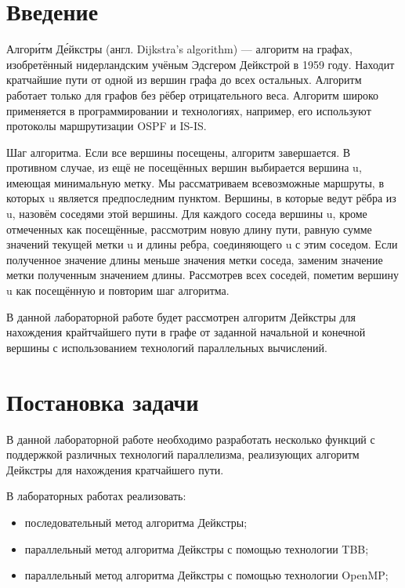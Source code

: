\documentclass{report}
\begin{document}
\setcounter{page}{2}

\tableofcontents
\newpage

\section*{Введение}
Алгори́тм Де́йкстры (англ. Dijkstra’s algorithm) — алгоритм на графах, изобретённый нидерландским учёным Эдсгером Дейкстрой в 1959 году. Находит кратчайшие пути от одной из вершин графа до всех остальных. Алгоритм работает только для графов без рёбер отрицательного веса. Алгоритм широко применяется в программировании и технологиях, например, его используют протоколы маршрутизации OSPF и IS-IS.
\par Шаг алгоритма.
Если все вершины посещены, алгоритм завершается.
В противном случае, из ещё не посещённых вершин выбирается вершина u, имеющая минимальную метку.
Мы рассматриваем всевозможные маршруты, в которых u является предпоследним пунктом. Вершины, в которые ведут рёбра из u, назовём соседями этой вершины. Для каждого соседа вершины u, кроме отмеченных как посещённые, рассмотрим новую длину пути, равную сумме значений текущей метки u и длины ребра, соединяющего u с этим соседом.
Если полученное значение длины меньше значения метки соседа, заменим значение метки полученным значением длины. Рассмотрев всех соседей, пометим вершину u как посещённую и повторим шаг алгоритма.
\par В данной лабораторной работе будет рассмотрен алгоритм Дейкстры для нахождения крайтчайшего пути в графе от заданной начальной и конечной вершины с использованием технологий параллельных вычислений.
\newpage

\section*{Постановка задачи}
В данной лабораторной работе необходимо разработать несколько функций с поддержкой различных технологий параллелизма, реализующих алгоритм Дейкстры для нахождения кратчайшего пути.
\par В лабораторных работах реализовать:
\begin{itemize}
\item последовательный метод алгоритма Дейкстры;
\item параллельный метод алгоритма Дейкстры с помощью технологии TBB;
\item параллельный метод алгоритма Дейкстры с помощью технологии OpenMP;

\end{itemize}
\end{document}
